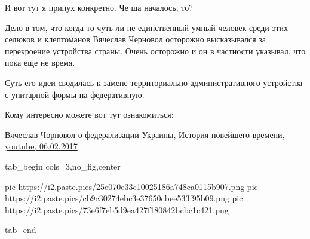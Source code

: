 \begin{multicols}{2}
И вот тут я припух конкретно. Че ща началось, то?

Дело в том, что когда-то чуть ли не единственный умный человек среди этих
селюков и клептоманов Вячеслав Черновол осторожно высказывался за перекроение
устройства страны. Очень осторожно и он в частности указывал, что пока еще не
время.

Суть его идеи сводилась к замене территориально-административного устройства с
унитарной формы на федеративную.

Кому интересно можете вот тут ознакомиться:

\href{https://www.youtube.com/watch?v=yhx3hXitop0}{%
Вячеслав Чорновол о федерализации Украины, История новейшего времени, youtube, 06.02.2017%
}

\end{multicols} %

\ifcmt
  tab_begin cols=3,no_fig,center

     pic https://i2.paste.pics/25e070e33c10025186a748ca0115b907.png
		 pic https://i2.paste.pics/cb9c30274ebc3e37650cbee533f95b09.png
		 pic https://i2.paste.pics/73e6f7eb5d9ea427f180842bcbc1c421.png

  tab_end
\fi


